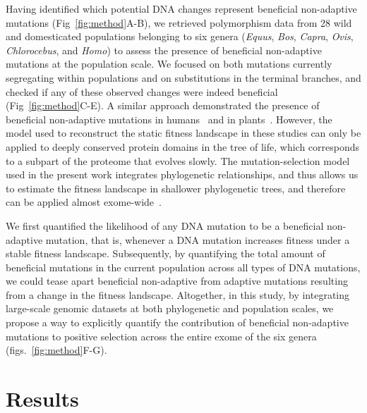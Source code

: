 \documentclass[10pt,letterpaper]{article}
\begin{document}
Having identified which potential DNA changes represent beneficial non-adaptive mutations (Fig~\ref{fig:method}A-B), we retrieved polymorphism data from 28 wild and domesticated populations belonging to six genera (\textit{Equus}, \textit{Bos}, \textit{Capra}, \textit{Ovis}, \textit{Chlorocebus}, and \textit{Homo}) to assess the presence of beneficial non-adaptive mutations at the population scale.
We focused on both mutations currently segregating within populations and on substitutions in the terminal branches, and checked if any of these observed changes were indeed beneficial (Fig~\ref{fig:method}C-E).
A similar approach demonstrated the presence of beneficial non-adaptive mutations in humans~\cite{moses_inferring_2009, fischer_germline_2011} and in plants~\cite{chen_hunting_2021}.
However, the model used to reconstruct the static fitness landscape in these studies can only be applied to deeply conserved protein domains in the tree of life, which corresponds to a subpart of the proteome that evolves slowly.
The mutation-selection model used in the present work integrates phylogenetic relationships, and thus allows us to estimate the fitness landscape in shallower phylogenetic trees, and therefore can be applied almost exome-wide~\cite{rodrigue_mutationselection_2010}.

We first quantified the likelihood of any DNA mutation to be a beneficial non-adaptive mutation, that is, whenever a DNA mutation increases fitness under a stable fitness landscape.
Subsequently, by quantifying the total amount of beneficial mutations in the current population across all types of DNA mutations, we could tease apart beneficial non-adaptive from adaptive mutations resulting from a change in the fitness landscape.
Altogether, in this study, by integrating large-scale genomic datasets at both phylogenetic and population scales, we propose a way to explicitly quantify the contribution of beneficial non-adaptive mutations to positive selection across the entire exome of the six genera (figs.~\ref{fig:method}F-G).

\section*{Results}
\end{document}
